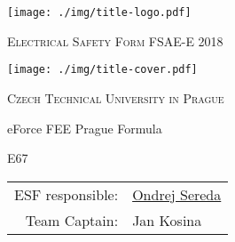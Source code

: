 	\centering	
\texttt{[image: ./img/title-logo.pdf]}
\vspace{.5cm}
{\scshape\huge Electrical Safety Form FSAE-E 2018 \par}
\vspace{.5cm}
\texttt{[image: ./img/title-cover.pdf]}	
\vspace{.5cm}
{\scshape\Large Czech Technical University in Prague\par}
\vspace{.5cm}
{\LARGE eForce FEE Prague Formula\par}
\vspace{.9cm}
{\LARGE E67\par}
\vspace{.6cm}

\begin{table}[H]
	\centering
	\begin{tabular}{rl}
		ESF responsible: &  \href{mailto:ondrej.sereda@eforce.cvut.cz}{Ondrej Sereda}  \\
		Team Captain: & Jan Kosina   \\
	\end{tabular}%
	\label{tab:title}%
\end{table}%



\vfill